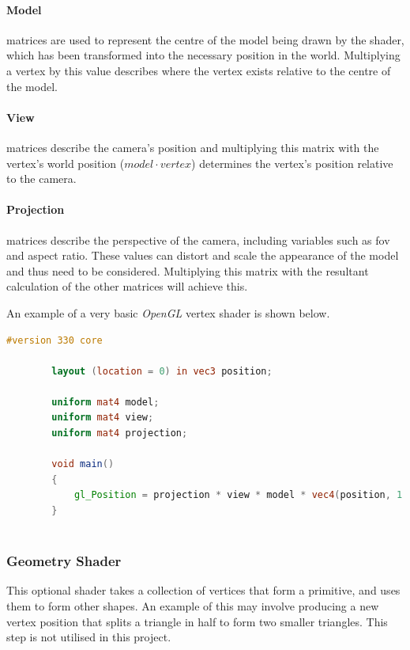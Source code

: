 \documentclass[12pt]{article}
\begin{document}
    \paragraph{Model}matrices are used to represent the centre of the model being drawn by the shader, which has been transformed into the necessary position in the world. Multiplying a vertex by this value describes where the vertex exists relative to the centre of the model.

    \paragraph{View}matrices describe the camera's position and multiplying this matrix with the vertex's world position ($model \cdot vertex$) determines the vertex's position relative to the camera.

    \paragraph{Projection}matrices describe the perspective of the camera, including variables such as fov and aspect ratio. These values can distort and scale the appearance of the model and thus need to be considered. Multiplying this matrix with the resultant calculation of the other matrices will achieve this.

    An example of a very basic \textit{OpenGL} vertex shader is shown below.

    \begin{lstlisting}[language=glsl]
        #version 330 core

        layout (location = 0) in vec3 position;

        uniform mat4 model;
        uniform mat4 view;
        uniform mat4 projection;

        void main()
        {
            gl_Position = projection * view * model * vec4(position, 1.0);
        }
        
    \end{lstlisting}

    \subsubsection{Geometry Shader}

    This optional shader takes a collection of vertices that form a primitive, and uses them to form other shapes. An example of this may involve producing a new vertex position that splits a triangle in half to form two smaller triangles. This step is not utilised in this project.
\end{document}
